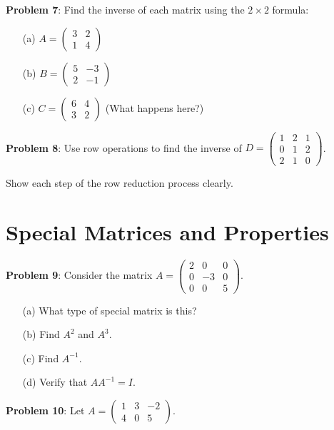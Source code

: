 \documentclass[11pt]{article}
\begin{document}
\textbf{Problem 7}: Find the inverse of each matrix using the $2 \times 2$ formula:

\begin{enumerate}
\item[(a)] $A = \begin{pmatrix} 3 & 2 \\ 1 & 4 \end{pmatrix}$
\item[(b)] $B = \begin{pmatrix} 5 & -3 \\ 2 & -1 \end{pmatrix}$
\item[(c)] $C = \begin{pmatrix} 6 & 4 \\ 3 & 2 \end{pmatrix}$ (What happens here?)
\end{enumerate}

\textbf{Problem 8}: Use row operations to find the inverse of $D = \begin{pmatrix} 1 & 2 & 1 \\ 0 & 1 & 2 \\ 2 & 1 & 0 \end{pmatrix}$.

Show each step of the row reduction process clearly.

\section{Special Matrices and Properties}

\textbf{Problem 9}: Consider the matrix $A = \begin{pmatrix} 2 & 0 & 0 \\ 0 & -3 & 0 \\ 0 & 0 & 5 \end{pmatrix}$.

\begin{enumerate}
\item[(a)] What type of special matrix is this?
\item[(b)] Find $A^2$ and $A^3$.
\item[(c)] Find $A^{-1}$.
\item[(d)] Verify that $AA^{-1} = I$.
\end{enumerate}

\textbf{Problem 10}: Let $A = \begin{pmatrix} 1 & 3 & -2 \\ 4 & 0 & 5 \end{pmatrix}$. 
\end{document}

